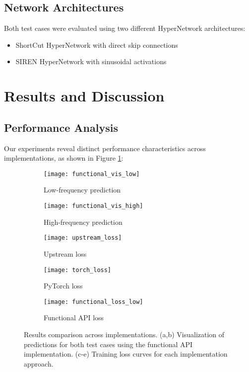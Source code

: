 \documentclass[10pt,journal,compsoc]{IEEEtran}
\begin{document}
\subsection{Network Architectures}
Both test cases were evaluated using two different HyperNetwork architectures:
\begin{itemize}
    \item ShortCut HyperNetwork with direct skip connections
    \item SIREN HyperNetwork with sinusoidal activations
\end{itemize}

\section{Results and Discussion}
\subsection{Performance Analysis}
Our experiments reveal distinct performance characteristics across implementations, as shown in Figure \ref{fig:results}:

\begin{figure}[t]
    \centering
    \begin{subfigure}[b]{0.48\linewidth}
        \texttt{[image: functional\_vis\_low]}
        \caption{Low-frequency prediction}
    \end{subfigure}
    \begin{subfigure}[b]{0.48\linewidth}
        \texttt{[image: functional\_vis\_high]}
        \caption{High-frequency prediction}
    \end{subfigure}
    
    \begin{subfigure}[b]{0.32\linewidth}
        \texttt{[image: upstream\_loss]}
        \caption{Upstream loss}
    \end{subfigure}
    \begin{subfigure}[b]{0.32\linewidth}
        \texttt{[image: torch\_loss]}
        \caption{PyTorch loss}
    \end{subfigure}
    \begin{subfigure}[b]{0.32\linewidth}
        \texttt{[image: functional\_loss\_low]}
        \caption{Functional API loss}
    \end{subfigure}
    \caption{Results comparison across implementations. (a,b) Visualization of predictions for both test cases using the functional API implementation. (c-e) Training loss curves for each implementation approach.}
    \label{fig:results}
\end{figure}
\end{document}
